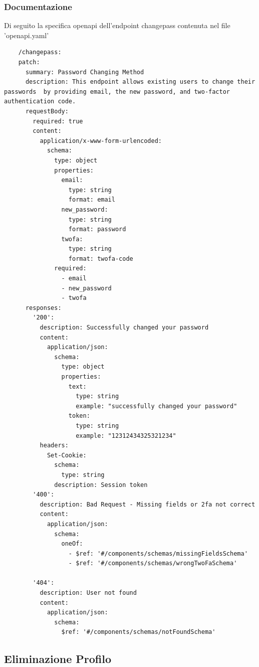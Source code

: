 \documentclass{report}
\begin{document}
\subsubsection*{Documentazione}
Di seguito la specifica openapi dell'endpoint changepass contenuta nel file 'openapi.yaml'
\begin{verbatim}
	/changepass:
    patch:
      summary: Password Changing Method
      description: This endpoint allows existing users to change their passwords  by providing email, the new password, and two-factor authentication code.
      requestBody:
        required: true
        content:
          application/x-www-form-urlencoded:
            schema:
              type: object
              properties:
                email:
                  type: string
                  format: email
                new_password:
                  type: string
                  format: password
                twofa:
                  type: string
                  format: twofa-code
              required:
                - email
                - new_password
                - twofa
      responses:
        '200':
          description: Successfully changed your password
          content:
            application/json:
              schema:
                type: object
                properties:
                  text:
                    type: string
                    example: "successfully changed your password"
                  token:
                    type: string
                    example: "12312434325321234"
          headers:
            Set-Cookie:
              schema:
                type: string
              description: Session token
        '400':
          description: Bad Request - Missing fields or 2fa not correct
          content:
            application/json:
              schema:
                oneOf:
                  - $ref: '#/components/schemas/missingFieldsSchema'
                  - $ref: '#/components/schemas/wrongTwoFaSchema'
      
        '404':
          description: User not found
          content:
            application/json:
              schema:
                $ref: '#/components/schemas/notFoundSchema'

\end{verbatim}
\subsection{Eliminazione Profilo}
\end{document}
